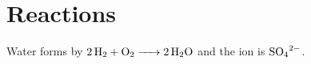 \documentclass{article}
\begin{document}
\section{Reactions}
Water forms by $\ce{2H2 + O2 -> 2H2O}$ and the ion is $\ce{SO4^2-}$.
\end{document}
